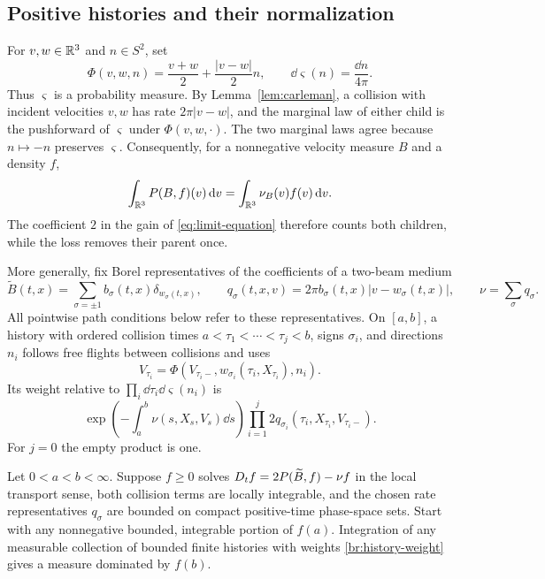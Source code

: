 \subsection{Positive histories and their normalization}

For \(v,w\in\mathbb R^3\) and \(n\in S^2\), set
\begin{equation}\label{br:sphere-map}
\Phi(v,w,n)=\frac{v+w}{2}+\frac{|v-w|}{2}n,
\qquad \dd\varsigma(n)=\frac{\dd n}{4\pi}.
\end{equation}
Thus \(\varsigma\) is a probability measure. By
Lemma~\ref{lem:carleman}, a collision with incident velocities \(v,w\)
has rate \(2\pi|v-w|\), and the marginal law of either child is the
pushforward of \(\varsigma\) under \(\Phi(v,w,\cdot)\). The two marginal
laws agree because \(n\mapsto-n\) preserves \(\varsigma\). Consequently,
for a nonnegative velocity measure \(B\) and a density \(f\),
\begin{equation}\label{br:gain-mass}
\int_{\mathbb R^3}P(B,f)(v)\,\mathrm d v=\int_{\mathbb R^3}\nu_B(v)f(v)\,\mathrm d v.
\end{equation}
The coefficient \(2\) in the gain of \eqref{eq:limit-equation} therefore
counts both children, while the loss removes their parent once.

More generally, fix Borel representatives of the coefficients of a
two-beam medium
\[
\widetilde B(t,x)=\sum_{\sigma=\pm1}b_\sigma(t,x)
                  \delta_{w_\sigma(t,x)},\qquad
q_\sigma(t,x,v)=2\pi b_\sigma(t,x)|v-w_\sigma(t,x)|,
\qquad \nu=\sum_\sigma q_\sigma.
\]
All pointwise path conditions below refer to these representatives.
On \([a,b]\), a history with ordered collision times
\(a<\tau_1<\cdots<\tau_j<b\), signs \(\sigma_i\), and directions \(n_i\)
follows free flights between collisions and uses
\[
V_{\tau_i}=\Phi(V_{\tau_i-},w_{\sigma_i}(\tau_i,X_{\tau_i}),n_i).
\]
Its weight relative to \(\prod_i\dd\tau_i\dd\varsigma(n_i)\) is
\begin{equation}\label{br:history-weight}
\exp\left(-\int_a^b\nu(s,X_s,V_s)\dd s\right)
\prod_{i=1}^j2q_{\sigma_i}(\tau_i,X_{\tau_i},V_{\tau_i-}).
\end{equation}
For \(j=0\) the empty product is one.

\begin{lemma}\label{br:positive-histories}
Let \(0<a<b<\infty\). Suppose \(f\ge0\) solves
\(D_t f=2P(\widetilde B,f)-\nu f\) in the local transport sense,
both collision terms are locally integrable, and the chosen rate
representatives \(q_\sigma\) are bounded on compact positive-time
phase-space sets. Start with any nonnegative bounded, integrable
portion of \(f(a)\). Integration of any measurable collection of bounded
finite histories with weights \eqref{br:history-weight} gives a measure
dominated by \(f(b)\).
\end{lemma}

